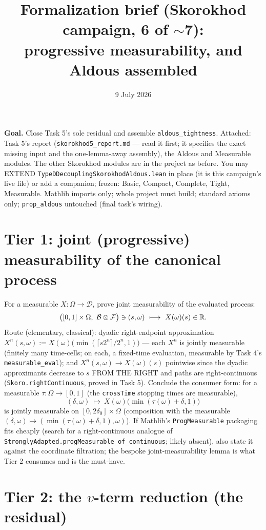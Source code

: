 \documentclass[11pt]{article}
\title{Formalization brief (Skorokhod campaign, 6 of $\sim$7):\\
progressive measurability, and Aldous assembled}
\date{9 July 2026}
\theoremstyle{plain}
\theoremstyle{remark}
\newcommand{\D}{\mathcal D}\newcommand{\eps}{\varepsilon}
\begin{document}
\maketitle

\noindent\textbf{Goal.} Close Task 5's sole residual and assemble
\texttt{aldous\_tightness}. Attached: Task 5's report
(\texttt{skorokhod5\_report.md} --- read it first; it specifies the exact
missing input and the one-lemma-away assembly), the Aldous and Measurable
modules. The other Skorokhod modules are in the project as before. You may
EXTEND \texttt{TypeDDecouplingSkorokhodAldous.lean} in place (it is this
campaign's live file) or add a companion; frozen: Basic, Compact, Complete,
Tight, Measurable. Mathlib imports only; whole project must build; standard
axioms only; \texttt{prop\_aldous} untouched (final task's wiring).

\section*{Tier 1: joint (progressive) measurability of the canonical process}

For a measurable $X:\Omega\to\D$, prove joint measurability of the evaluated
process:
\[
  \big([0,1]\times\Omega,\ \mathcal B\otimes\mathcal F\big)\ni(s,\omega)
  \ \longmapsto\ X(\omega)(s)\in\mathbb{R} .
\]
Route (elementary, classical): dyadic right-endpoint approximation
$X^n(s,\omega):=X(\omega)\big(\min(\lceil s2^n\rceil/2^n,1)\big)$ --- each
$X^n$ is jointly measurable (finitely many time-cells; on each, a fixed-time
evaluation, measurable by Task 4's \texttt{measurable\_eval}); and
$X^n(s,\omega)\to X(\omega)(s)$ pointwise since the dyadic approximants
decrease to $s$ FROM THE RIGHT and paths are right-continuous
(\texttt{Skoro.rightContinuous}, proved in Task 5). Conclude the consumer
form: for a measurable $\tau:\Omega\to[0,1]$ (the \texttt{crossTime}
stopping times are measurable),
\[
  (\delta,\omega)\ \longmapsto\ X(\omega)\big(\min(\tau(\omega)+\delta,1)\big)
\]
is jointly measurable on $[0,2\delta_0]\times\Omega$ (composition with the
measurable $(\delta,\omega)\mapsto(\min(\tau(\omega)+\delta,1),\omega)$).
If Mathlib's \texttt{ProgMeasurable} packaging fits cheaply (search for a
right-continuous analogue of
\texttt{StronglyAdapted.progMeasurable\_of\_continuous}; likely absent),
also state it against the coordinate filtration; the bespoke joint-measurability
lemma is what Tier 2 consumes and is the must-have.

\section*{Tier 2: the $v$-term reduction (the residual)}
\end{document}

